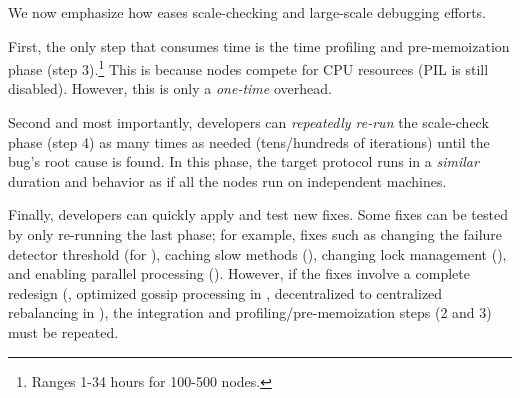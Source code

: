  We now emphasize how \sck eases
scale-checking and large-scale debugging efforts.  

First, the only step that consumes time is the time
profiling and pre-memoization phase (step 3).\footnote{Ranges
1-34 hours for 100-500 nodes.}  This is because nodes
compete for CPU resources (PIL is still disabled).  However, this is only
a {\em one-time} overhead.
%

Second and most importantly, developers can {\em repeatedly re-run} the
scale-check phase (step 4) as many times as needed (tens/hundreds of
iterations) until the bug's root cause is found.  In this phase, the
target protocol runs in a {\em similar} duration and behavior as if all
the nodes run on independent machines.

%
Finally, developers can quickly apply and test new fixes.
%
Some fixes can be tested by only re-running the last phase; for example,
fixes such as
%
changing the failure detector \phi threshold (for \caone),
%
caching slow methods (\catwo),
%
changing lock management (\cafour), and
%
enabling parallel processing (\voldone).
%
%
However, if the fixes involve a complete redesign (\eg, optimized gossip
processing in \catri, decentralized to centralized rebalancing in
\riakone), the integration and profiling/pre-memoization steps (2 and 3)
must be repeated.

